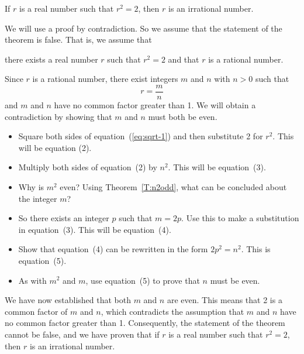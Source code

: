 \setcounter{equation}{0}
\begin{theorem}\label{T:squareroot2}
If  $r$  is a real number such that  $r^2  = 2$, then  $r$  is an irrational number.
\end{theorem}

\begin{myproof}
We will use a proof by contradiction.  So we assume that the statement of the theorem is false.  That is, we assume that
\begin{list}{}
  \item there exists a real number $r$ such that $r^2  = 2$ and that  $r$  is a rational number.
\end{list}
\vskip6pt

\noindent
Since  $r$  is a rational number, there exist integers  $m$  and  $n$  with  $n > 0$ such that  
\begin{equation} \label{eq:sqrt-1}
r = \frac{m}{n}
\end{equation}
and  $m$  and  $n$  have no common factor greater than 1.  We will obtain a contradiction by showing that  $m$  and  $n$  must both be even.
\begin{itemize} 
  \item Square both sides of equation~(\ref{eq:sqrt-1}) and then substitute 2 for $r^2$.  This will be equation (2).
  \item Multiply both sides of equation~(2) by $n^2$.  This will be equation~(3).
  \item Why is $m^2$ even?  Using Theorem~\ref{T:n2odd}, what can be concluded about the integer $m$?
  \item So there exists an integer $p$ such that $m = 2p$.  Use this to make a substitution in equation~(3). This will be equation~(4).
  \item Show that equation~(4) can be rewritten in the form $2p^2 = n^2$.  This is equation~(5). 
  \item As with $m^2$ and $m$, use equation~(5) to prove that $n$ must be even. 
\end{itemize}
We have now established that both  $m$  and  $n$  are even.  This means that  2  is a common factor of  $m$  and  $n$, which contradicts the assumption that $m$  and  $n$  have no common factor greater than 1.  Consequently, the statement of the theorem cannot be false, and we have proven that if  $r$  is a real number such that  $r^2  = 2$, then  $r$  is an irrational number.
\end{myproof}

